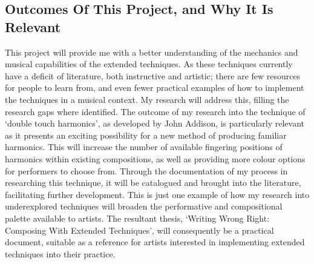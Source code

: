 \subsection{Outcomes Of This Project, and Why It Is Relevant}
This project will provide me with a better understanding of the mechanics and musical capabilities of the extended techniques. As these techniques currently have a deficit of literature, both instructive and artistic; there are few resources for people to learn from, and even fewer practical examples of how to implement the techniques in a musical context.
My research will address this, filling the research gaps where identified.
The outcome of my research into the technique of `double touch harmonics', as developed by John Addison, is particularly relevant as it presents an exciting possibility for a new method of producing familiar harmonics.
This will increase the number of available fingering positions of harmonics within existing compositions, as well as providing more colour options for performers to choose from.
Through the documentation of my process in researching this technique, it will be catalogued and brought into the literature, facilitating further development.
This is just one example of how my research into underexplored techniques will broaden the performative and compositional palette available to artists. 
The resultant thesis, `Writing Wrong Right: Composing With Extended Techniques', will consequently be a practical document, suitable as a reference for artists interested in implementing extended techniques into their practice.



